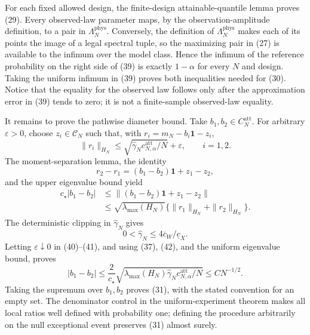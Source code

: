 For each fixed allowed design, the finite-design attainable-quantile lemma proves (29).  Every observed-law parameter maps, by the observation-amplitude definition, to a pair in \(\Lambda_N^{\mathrm{phys}}\).  Conversely, the definition of \(\Lambda_N^{\mathrm{phys}}\) makes each of its points the image of a legal spectral tuple, so the maximizing pair in (27) is available to the infimum over the model class.  Hence the infimum of the reference probability on the right side of (39) is exactly \(1-\alpha\) for every \(N\) and design.  Taking the uniform infimum in (39) proves both inequalities needed for (30).  Notice that the equality for the observed law follows only after the approximation error in (39) tends to zero; it is not a finite-sample observed-law equality.

It remains to prove the pathwise diameter bound.  Take \(b_1,b_2\in C_N^{\mathrm{att}}\).  For arbitrary \(\varepsilon>0\), choose \(z_i\in\mathcal C_N\) such that, with \(r_i=m_N-b_i\mathbf1-z_i\),
\[
\|r_i\|_{H_N}\le
\sqrt{\widehat\gamma_Nc_{N,\alpha}^{\mathrm{att}}/N}+\varepsilon,
\qquad i=1,2.                                                                \tag{40}
\]
The moment-separation lemma, the identity
\[
r_2-r_1=(b_1-b_2)\mathbf1+z_1-z_2,
\]
and the upper eigenvalue bound yield
\[
\begin{aligned}
c_\star|b_1-b_2|
&\le\|(b_1-b_2)\mathbf1+z_1-z_2\|\\
&\le\sqrt{\lambda_{\max}(H_N)}
   \{\|r_1\|_{H_N}+\|r_2\|_{H_N}\}.                                      \tag{41}
\end{aligned}
\]
The deterministic clipping in \(\widehat\gamma_N\) gives
\[
0<\widehat\gamma_N\le4\overline c_W/\underline c_X.                        \tag{42}
\]
Letting \(\varepsilon\downarrow0\) in (40)--(41), and using (37), (42), and the uniform eigenvalue bound, proves
\[
|b_1-b_2|\le
\frac{2}{c_\star}
\sqrt{\lambda_{\max}(H_N)\widehat\gamma_N
      c_{N,\alpha}^{\mathrm{att}}/N}
\le C N^{-1/2}.                                                               \tag{43}
\]
Taking the supremum over \(b_1,b_2\) proves (31), with the stated convention for an empty set.  The denominator control in the uniform-experiment theorem makes all local ratios well defined with probability one; defining the procedure arbitrarily on the null exceptional event preserves (31) almost surely.

